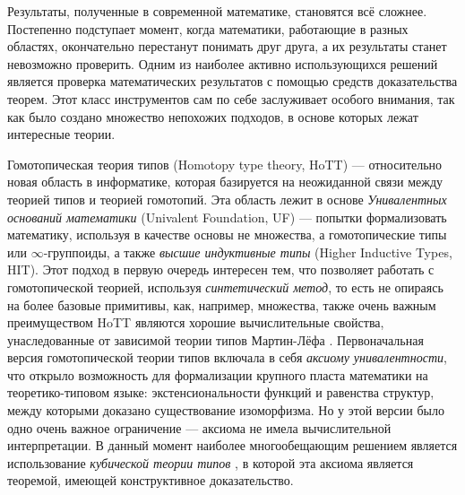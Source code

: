 







\Annot

Результаты, полученные в современной математике, становятся всё сложнее. Постепенно подступает момент, когда математики, работающие в разных областях, окончательно перестанут понимать друг друга, а их результаты станет невозможно проверить. Одним из наиболее активно использующихся решений является проверка математических результатов с помощью средств доказательства теорем. Этот класс инструментов сам по себе заслуживает особого внимания, так как было создано множество непохожих подходов, в основе которых лежат интересные теории.

Гомотопическая теория типов (Homotopy type theory, HoTT) \autocite{hottbook} --- относительно новая область в информатике, которая базируется на неожиданной связи между теорией типов и теорией гомотопий. Эта область лежит в основе \textit{Унивалентных оснований математики} (Univalent Foundation, UF) \autocite{UFP2010} --- попытки формализовать математику, используя в качестве основы не множества, а гомотопические типы или $\infty$-группоиды, а также \textit{высшие индуктивные типы} (Higher Inductive Types, HIT). Этот подход в первую очередь интересен тем, что позволяет работать с гомотопической теорией, используя \textit{синтетический метод}, то есть не опираясь на более базовые примитивы, как, например, множества, также очень важным преимуществом HoTT являются хорошие вычислительные свойства, унаследованные от зависимой теории типов Мартин-Лёфа \autocite{MLTT}. Первоначальная версия гомотопической теории типов включала в себя \textit{аксиому унивалентности}, что открыло возможность для формализации крупного пласта математики на теоретико-типовом языке: экстенсиональности функций и равенства структур, между которыми доказано существование изоморфизма. Но у этой версии было одно очень важное ограничение --- аксиома не имела вычислительной интерпретации. В данный момент наиболее многообещающим решением является использование \textit{кубической теории типов} \autocite{CohenCHM16}, в которой эта аксиома является теоремой, имеющей конструктивное доказательство.

